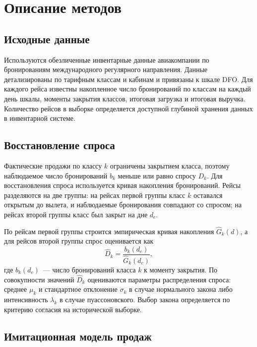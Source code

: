 \documentclass{misisarticle}
\begin{document}
\section{Описание методов}

\subsection{Исходные данные}

Используются обезличенные инвентарные данные авиакомпании по бронированиям международного регулярного направления. Данные детализированы по тарифным классам и кабинам и привязаны к шкале DFO. Для каждого рейса известны накопленное число бронирований по классам на каждый день шкалы, моменты закрытия классов, итоговая загрузка и итоговая выручка. Количество рейсов в выборке определяется доступной глубиной хранения данных в инвентарной системе.

\subsection{Восстановление спроса}

Фактические продажи по классу $k$ ограничены закрытием класса, поэтому наблюдаемое число бронирований $b_k$ меньше или равно спросу $D_k$. Для восстановления спроса используется кривая накопления бронирований. Рейсы разделяются на две группы: на рейсах первой группы класс $k$ оставался открытым до вылета, и наблюдаемые бронирования совпадают со спросом; на рейсах второй группы класс был закрыт на дне $d_c$.

По рейсам первой группы строится эмпирическая кривая накопления $\hat{G}_k(d)$, а для рейсов второй группы спрос оценивается как
\begin{equation}
  \hat{D}_k = \frac{b_k(d_c)}{\hat{G}_k(d_c)},
  \label{eq:unconstrain}
\end{equation}
где $b_k(d_c)$~--- число бронирований класса $k$ к моменту закрытия. По совокупности значений $\hat{D}_k$ оцениваются параметры распределения спроса: среднее $\mu_k$ и стандартное отклонение $\sigma_k$ в случае нормального закона либо интенсивность $\lambda_k$ в случае пуассоновского. Выбор закона определяется по критерию согласия на исторической выборке.

\subsection{Имитационная модель продаж}
\end{document}
